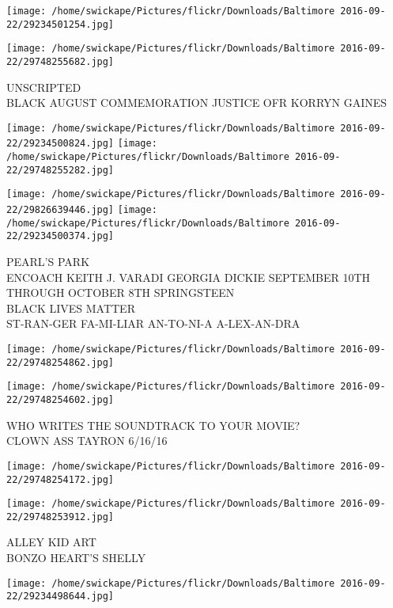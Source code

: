 \documentclass[10pt,letterpaper]{article}
\begin{document}
\texttt{[image: /home/swickape/Pictures/flickr/Downloads/Baltimore 2016-09-22/29234501254.jpg]}

\vspace{0.25in}
\texttt{[image: /home/swickape/Pictures/flickr/Downloads/Baltimore 2016-09-22/29748255682.jpg]}

UNSCRIPTED\\
BLACK AUGUST COMMEMORATION JUSTICE OFR KORRYN GAINES
\pagebreak

\texttt{[image: /home/swickape/Pictures/flickr/Downloads/Baltimore 2016-09-22/29234500824.jpg]}
\texttt{[image: /home/swickape/Pictures/flickr/Downloads/Baltimore 2016-09-22/29748255282.jpg]}

\texttt{[image: /home/swickape/Pictures/flickr/Downloads/Baltimore 2016-09-22/29826639446.jpg]}
\texttt{[image: /home/swickape/Pictures/flickr/Downloads/Baltimore 2016-09-22/29234500374.jpg]}

PEARL'S PARK\\
ENCOACH KEITH J. VARADI GEORGIA DICKIE SEPTEMBER 10TH THROUGH OCTOBER 8TH SPRINGSTEEN\\
BLACK LIVES MATTER\\
ST{-}RAN{-}GER FA{-}MI{-}LIAR AN{-}TO{-}NI{-}A A{-}LEX{-}AN{-}DRA
\pagebreak

\texttt{[image: /home/swickape/Pictures/flickr/Downloads/Baltimore 2016-09-22/29748254862.jpg]}

\vspace{0.25in}
\texttt{[image: /home/swickape/Pictures/flickr/Downloads/Baltimore 2016-09-22/29748254602.jpg]}

WHO WRITES THE SOUNDTRACK TO YOUR MOVIE?\\
CLOWN ASS TAYRON 6/16/16
\pagebreak

\texttt{[image: /home/swickape/Pictures/flickr/Downloads/Baltimore 2016-09-22/29748254172.jpg]}

\vspace{0.25in}
\texttt{[image: /home/swickape/Pictures/flickr/Downloads/Baltimore 2016-09-22/29748253912.jpg]}

ALLEY KID ART\\
BONZO HEART'S SHELLY
\pagebreak

\texttt{[image: /home/swickape/Pictures/flickr/Downloads/Baltimore 2016-09-22/29234498644.jpg]}
\end{document}
